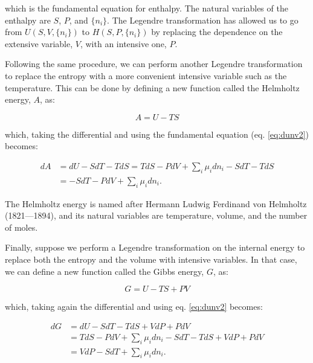 \documentclass[
  9pt,
]{extbook}
\theoremstyle{definition}
\theoremstyle{definition}
\theoremstyle{definition}
\theoremstyle{definition}
\theoremstyle{remark}
\begin{document}
which is the fundamental equation for enthalpy. The natural variables of the enthalpy are \(S\), \(P\), and \(\{n_i\}\). The Legendre transformation has allowed us to go from \(U(S,V,\{n_i\})\) to \(H(S,P,\{n_i\})\) by replacing the dependence on the extensive variable, \(V\), with an intensive one, \(P\).

Following the same procedure, we can perform another Legendre transformation to replace the entropy with a more convenient intensive variable such as the temperature. This can be done by defining a new function called the Helmholtz energy, \(A\), as:

\begin{equation}
A = U -TS
\label{eq:dadef1}
\end{equation}

which, taking the differential and using the fundamental equation (eq. \eqref{eq:dunv2}) becomes:

\begin{equation}
\begin{aligned}
dA &= dU -SdT -TdS = TdS - PdV +\sum_i \mu_i dn_i -SdT -TdS  \\
   &= -SdT -PdV +\sum_i \mu_i dn_i.
\end{aligned}
\label{eq:dadef2}
\end{equation}

The Helmholtz energy is named after Hermann Ludwig Ferdinand von Helmholtz (1821---1894), and its natural variables are temperature, volume, and the number of moles.

Finally, suppose we perform a Legendre transformation on the internal energy to replace both the entropy and the volume with intensive variables. In that case, we can define a new function called the Gibbs energy, \(G\), as:

\begin{equation}
G = U -TS +PV
\label{eq:dgdef1}
\end{equation}

which, taking again the differential and using eq. \eqref{eq:dunv2} becomes:

\begin{equation}
\begin{aligned}
dG &= dU -SdT -TdS +VdP +PdV \\
   &= TdS - PdV +\sum_i\mu_i dn_i -SdT -TdS +VdP +PdV \\
   &= VdP -SdT +\sum_i\mu_i dn_i.
\end{aligned}
\label{eq:dgdef2}
\end{equation}
\end{document}
